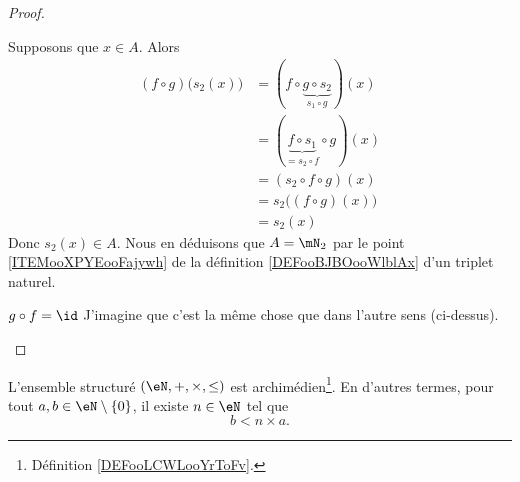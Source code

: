 \begin{proof}
\begin{subproof}
        Supposons que \( x\in A\). Alors
        \begin{subequations}
            \begin{align}
                (f\circ g)\big( s_2(x) \big)&=(f\circ \underbrace{g\circ s_2}_{s_1\circ g})(x)\\
                &=(\underbrace{f\circ s_1}_{=s_2\circ f}\circ g)(x)\\
                &=(s_2\circ f\circ g)(x)\\
                &=s_2\big( (f\circ g)(x) \big)\\
                &=s_2(x)
            \end{align}
        \end{subequations}
        Donc \( s_2(x)\in A\). Nous en déduisons que \( A=\mN_2\) par le point \ref{ITEMooXPYEooFajywh} de la définition \ref{DEFooBJBOooWlblAx} d'un triplet naturel.
    \item[\( g\circ f=\id\)]
        J'imagine que c'est la même chose que dans l'autre sens (ci-dessus).
    \end{subproof}
\end{proof}

\begin{proposition}     \label{PROPooCCVNooYUYcqG}
    L'ensemble structuré \( (\eN,+,\times, \leq)\) est archimédien\footnote{Définition \ref{DEFooLCWLooYrToFv}.}. En d'autres termes, pour tout \( a,b\in \eN\setminus\{ 0 \}\), il existe \( n\in \eN\) tel que
    \begin{equation}
        b<n\times a.
    \end{equation}
\end{proposition}

